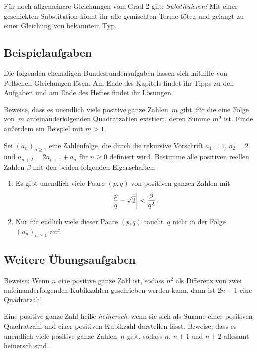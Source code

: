 Für noch allgemeinere Gleichungen vom Grad 2 gilt: \emph{Substituieren!} Mit einer geschickten Substitution könnt ihr alle gemischten Terme töten und gelangt zu einer Gleichung von bekanntem Typ.

\subsection*{Beispielaufgaben}
Die folgenden ehemaligen Bundesrundenaufgaben lassen sich mithilfe von Pellschen Gleichungen lösen. Am Ende des Kapitels findet ihr Tipps zu den Aufgaben und am Ende des Heftes findet ihr Lösungen.
\begin{aufgabe*}\label{aufgabe:561246}
	Beweise, dass es unendlich viele positive ganze Zahlen~$m$ gibt, für die eine Folge von~$m$ aufeinanderfolgenden Quadratzahlen existiert, deren Summe $m^3$ ist. Finde außerdem ein Beispiel mit $m>1$.
\end{aufgabe*}
\begin{aufgabe*}[***]\label{aufgabe:521246}
	Sei $(a_n)_{n\geqslant 1}$ eine Zahlenfolge, die durch die rekursive Vorschrift $a_1=1$, $a_2=2$ und $a_{n+2}=2a_{n+1}+a_n$ für $n\geqslant 0$ definiert wird. Bestimme alle positiven reellen Zahlen $\beta$ mit den beiden folgenden Eigenschaften:
	\begin{enumerate}[label={$(\Alph*)$},ref={$(\Alph*)$}]
		\item Es gibt unendlich viele Paare $(p,q)$ von positiven ganzen Zahlen mit\label{bedingung:RationaleApproximation}
		\begin{equation*}
			\abs*{\frac pq-\sqrt{2}}<\frac{\beta}{q^2}\,.
		\end{equation*}
		\item Nur für endlich viele dieser Paare $(p,q)$ taucht~$q$ nicht in der Folge $(a_n)_{n\geqslant 1}$ auf.\label{bedingung:NurEndlichVieleNichtInDerFolge}
	\end{enumerate}
\end{aufgabe*}

\subsection*{Weitere Übungsaufgaben}
\begin{aufgabe*}
	Beweise: Wenn $n$ eine positive ganze Zahl ist, sodass $n^2$ als Differenz von zwei aufeinanderfolgenden Kubikzahlen geschrieben werden kann, dann ist $2n-1$ eine Quadratzahl.
\end{aufgabe*}
\begin{aufgabe*}
	Eine positive ganze Zahl heiße \emph{heinersch}, wenn sie sich als Summe einer positiven Quadratzahl und einer positiven Kubikzahl darstellen lässt. Beweise, dass es unendlich viele positive ganze Zahlen~$n$ gibt, sodass $n$, $n+1$ und $n+2$ allesamt heinersch sind. 
\end{aufgabe*}

